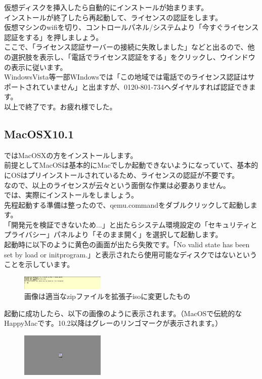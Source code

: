 \documentclass[b5paper,9pt,platex,dvipdfmx]{jsarticle}
\begin{document}
\begin{multicols*}{3}
{仮想ディスクを挿入したら自動的にインストールが始まります。\\
インストールが終了したら再起動して、ライセンスの認証をします。\\
仮想マシンのwifiを切り、コントロールパネル/システムより「今すぐライセンス認証をする」を押しましょう。\\
ここで、「ライセンス認証サーバーの接続に失敗しました」などと出るので、他の選択肢を表示し、「電話でライセンス認証をする」をクリックし、ウインドウの表示に従います。\\
WindowsVista等一部WIndowsでは「この地域では電話でのライセンス認証はサポートされていません」と出ますが、0120-801-734へダイヤルすれば認証できます。\\
以上で終了です。お疲れ様でした。\\
\subsection{MacOSX10.1}
ではMacOSXの方をインストールします。\\
前提としてMacOSは基本的にMacでしか起動できないようになっていて、基本的にOSはプリインストールされているため、ライセンスの認証が不要です。\\
なので、以上のライセンスが云々という面倒な作業は必要ありません。\\
では、実際にインストールをしましょう。\\
先程起動する準備は整ったので、qemu.commandをダブルクリックして起動します。\\
「開発元を検証できないため...」と出たらシステム環境設定の「セキュリティとプライバシー」パネルより「そのまま開く」を選択して起動します。\\
起動時に以下のように黄色の画面が出たら失敗です。「No valid  state has been set by load or init\-program.」と表示されたら使用可能なディスクではないということを示しています。\\
\begin{figure}[H]
  \centering
  \includegraphics[width=4cm]{4.png}
  \caption{画像は適当なzipファイルを拡張子isoに変更したもの}
\end{figure}
起動に成功したら、以下の画像のように表示されます。（MacOSで伝統的なHappyMacです。10.2以降はグレーのリンゴマークが表示されます。）\\
\begin{figure}[H]
  \centering
  \includegraphics[width=4cm]{5.png}

\end{figure}}
\end{multicols*}
\end{document}
